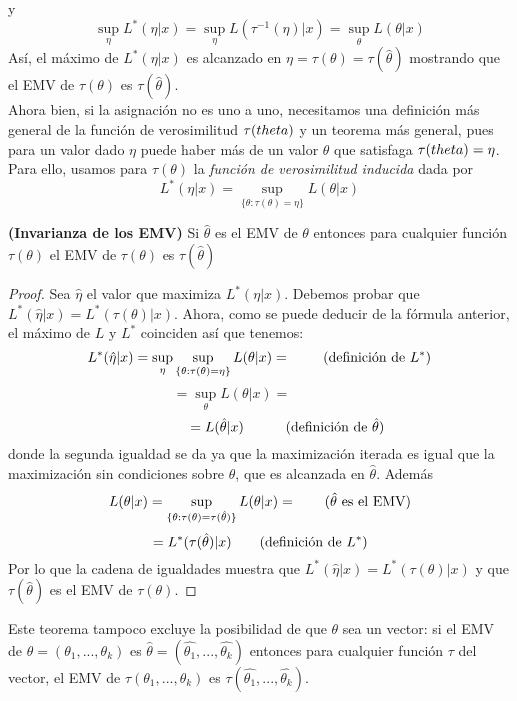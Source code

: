 y
\[ \sup_{\eta}L^{*}(\eta \vert x) = \sup_{\eta}L(\tau^{-1}(\eta) \vert x) = \sup_{\theta}L(\theta \vert x) \]
Así, el máximo de $L^{*}(\eta \vert x) $ es alcanzado en $\eta = \tau(\theta) = \tau(\hat{\theta})$ mostrando que el EMV de $\tau(\theta)$ es $\tau(\hat{\theta})$.\\
Ahora bien, si la asignación no es uno a uno, necesitamos una definición más general de  la función de verosimilitud $\tau(\\theta)$ y un teorema más general, pues para un valor dado $\eta$ puede haber más de un valor $\theta$ que satisfaga $\tau(\\theta) = \eta$.\\
Para ello, usamos para $\tau(\theta)$ la \textit{función de verosimilitud inducida} dada por \[ L^{*}(\eta \vert x) = \sup_{\lbrace \theta:\tau(\theta)=\eta \rbrace} L(\theta \vert x) \]
\begin{teorema}
\textbf{(Invarianza de los EMV)} Si $\hat{\theta}$ es el EMV de $\theta$  entonces para cualquier función $\tau(\theta)$ el EMV de $\tau(\theta)$ es $\tau(\hat{\theta})$
\end{teorema}
\begin{proof}
Sea $\hat{\eta}$ el valor que maximiza $L^{*}(\eta \vert x)$. Debemos probar que $L^{*}(\hat{\eta} \vert x) = L^{*}(\tau(\theta) \vert x)$. Ahora, como se puede deducir de la fórmula anterior, el máximo de $L$ y $L^{*}$ coinciden así que tenemos: 
\[ L^{*}(\hat{\eta} \vert x) = \sup_{\eta} \sup_{\lbrace \theta:\tau(\theta)=\eta \rbrace} L(\theta \vert x)= \quad \quad \textnormal{ (definición de } L^{*} \textnormal{)} \]
\[ =\sup_{\theta}L(\theta \vert x) = \quad \quad \quad \quad \]
\[\quad \quad \quad \quad  = L(\hat{\theta} \vert x) \quad \quad \quad \textnormal{(definición de } \hat{\theta} \textnormal{)} \]
donde la segunda igualdad se da ya que la maximización iterada es igual que la maximización sin condiciones sobre $\theta$, que es alcanzada en $\hat{\theta}$. Además
\[ L(\theta \vert x) = \sup_{\lbrace \theta:\tau(\theta)=\tau(\hat{\theta}) \rbrace} L(\theta \vert x)= \quad \quad \textnormal{(} \hat{\theta} \textnormal{ es el EMV)} \]
\[ =L^{*}(\tau(\hat{\theta}) \vert x) \quad \quad \textnormal{(definición de } L^{*} \textnormal{)} \]
Por lo que la cadena de igualdades muestra que $L^{*}(\hat{\eta} \vert x) = L^{*}(\tau(\theta) \vert x)$ y que $\tau(\hat{\theta})$ es el EMV de $\tau(\theta)$.
\end{proof}
Este teorema tampoco excluye la posibilidad de que $\theta$ sea un vector: si el EMV de $\theta=(\theta_{1},...,\theta_{k})$ es $\hat{\theta}=(\hat{\theta_{1}},...,\hat{\theta_{k}})$ entonces para cualquier función $\tau$ del vector, el EMV de $\tau(\theta_{1},...,\theta_{k})$ es $\tau(\hat{\theta_{1}},...,\hat{\theta_{k}})$. \cite{garthwaite2002statistical}
